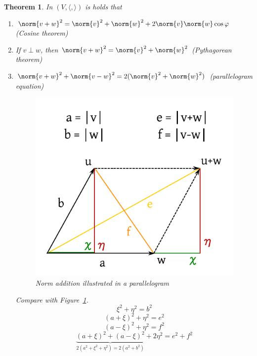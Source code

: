 \documentclass[a4paper,landscape,twocolumn]{article}
\newtheorem{theorem}{Theorem}
\DeclarePairedDelimiter\norm\lVert\rVert
\begin{document}
\begin{theorem}
  \label{satz-8.34}
  In $(V, \langle, \rangle)$ is holds that
  \begin{enumerate}
    \item $\norm{v + w}^2 = \norm{v}^2 + \norm{w}^2 + 2 \norm{v} \norm{w} \cos{\varphi}$ (Cosine theorem)
    \item If $v \perp w$, then $\norm{v + w}^2 = \norm{v}^2 + \norm{w}^2$ (Pythagorean theorem)
    \item $\norm{v + w}^2 + \norm{v - w}^2 = 2 (\norm{v}^2 + \norm{w}^2)$ (parallelogram equation)

      \begin{figure}[!h]
        \begin{center}
          \includegraphics{img/parallelogram_norms.pdf}
          \caption{Norm addition illustrated in a parallelogram}
          \label{img:norm-parallelogram}
        \end{center}
      \end{figure}

      Compare with Figure~\ref{img:norm-parallelogram}.
      \[ \xi^2 + \eta^2 = b^2 \]
      \[ (a + \xi)^2 + \eta^2 = e^2 \]
      \[ (a - \xi)^2 + \eta^2 = f^2 \]
      \[ \underbrace{(a + \xi)^2 + (a - \xi)^2}_{2(a^2 + \xi^2 + \eta^2) = 2 (a^2 + b^2)} + 2\eta^2 = e^2 + f^2 \]
  \end{enumerate}
\end{theorem}
\end{document}

